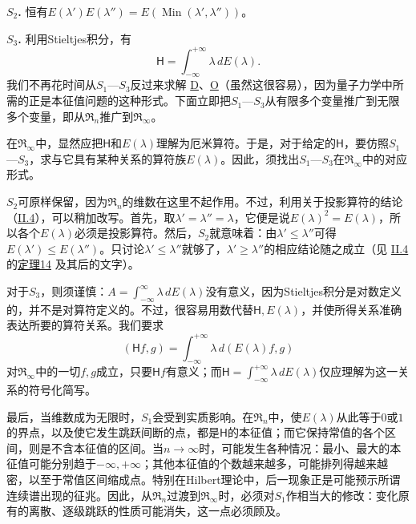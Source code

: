 \documentclass[fontsize=13pt,twoside,openany,headings=normal,parskip=false,bookmarkpackage=false,DIV=calc]{scrbook}
\begin{document}
\leavevmode{}\textbf{$S_2$.}\label{cond:II.S2} 恒有$E(\lambda')E(\lambda'')=E(\operatorname{Min}(\lambda',\allowbreak \lambda''))$。

\leavevmode{}\textbf{$S_3$.}\label{cond:II.S3} 利用Stieltjes积分，有
\[
\mathsf H=\int_{-\infty}^{+\infty}\lambda\,dE(\lambda).
\]
我们不再花时间从$\hyperref[cond:II.S1]{S_1}$—$\hyperref[cond:II.S3]{S_3}$反过来求解 \hyperref[eq:II.7.D]{D}、\hyperref[eq:II.7.O]{O}（虽然这很容易），因为量子力学中所需的正是本征值问题的这种形式。下面立即把$\hyperref[cond:II.S1]{S_1}$—$\hyperref[cond:II.S3]{S_3}$从有限多个变量推广到无限多个变量，即从$\mathfrak{R}_n$推广到$\mathfrak{R}_\infty$。

在$\mathfrak{R}_\infty$中，显然应把$\mathsf H$和$E(\lambda)$理解为厄米算符。于是，对于给定的$\mathsf H$，要仿照$\hyperref[cond:II.S1]{S_1}$—$\hyperref[cond:II.S3]{S_3}$，求与它具有某种关系的算符族$E(\lambda)$。因此，须找出$\hyperref[cond:II.S1]{S_1}$—$\hyperref[cond:II.S3]{S_3}$在$\mathfrak{R}_\infty$中的对应形式。

$\hyperref[cond:II.S2]{S_2}$可原样保留，因为$\mathfrak{R}_n$的维数在这里不起作用。不过，利用关于投影算符的结论（\hyperref[sec:II.4]{II.4}），可以稍加改写。首先，取$\lambda'=\lambda''=\lambda$，它便是说$E(\lambda)^2=E(\lambda)$，所以各个$E(\lambda)$必须是投影算符。然后，$\hyperref[cond:II.S2]{S_2}$就意味着：由$\lambda'\leq\lambda''$可得$E(\lambda')\leq E(\lambda'')$。只讨论$\lambda'\leq\lambda''$就够了，$\lambda'\geq\lambda''$的相应结论随之成立（见 \hyperref[sec:II.4]{II.4} 的\CJKglue \hyperref[thm:II.14]{定理14} 及其后的文字）。

\hypertarget{origpage-60}{}\label{origpage-60}对于$\hyperref[cond:II.S3]{S_3}$，则须谨慎：$A=\int_{-\infty}^{\infty}\lambda\,dE(\lambda)$没有意义，因为Stieltjes积分是对数定义的，并不是对算符定义的。不过，很容易用数代替$\mathsf H,\allowbreak E(\lambda)$，并使所得关系准确表达所要的算符关系。我们要求
\[
(\mathsf Hf,g)=\int_{-\infty}^{+\infty}\lambda\,d(E(\lambda)f,g)
\]
对$\mathfrak{R}_\infty$中的一切$f,\allowbreak g$成立，只要$\mathsf Hf$有意义；而$\mathsf H=\int_{-\infty}^{+\infty}\lambda\,dE(\lambda)$仅应理解为这一关系的符号化简写。

最后，当维数成为无限时，$\hyperref[cond:II.S1]{S_1}$会受到实质影响。在$\mathfrak{R}_n$中，使$E(\lambda)$从此等于$0$或$1$的界点，以及使它发生跳跃间断的点，都是$\mathsf H$的本征值；而它保持常值的各个区间，则是不含本征值的区间。当$n\to\infty$时，可能发生各种情况：最小、最大的本征值可能分别趋于$-\infty,\allowbreak +\infty$；其他本征值的个数越来越多，可能排列得越来越密，以至于常值区间缩成点。特别在Hilbert理论中，后一现象正是可能预示所谓连续谱出现的征兆。因此，从$\mathfrak{R}_n$过渡到$\mathfrak{R}_\infty$时，必须对$\hyperref[cond:II.S1]{S_1}$作相当大的修改：变化原有的离散、逐级跳跃的性质可能消失，这一点必须顾及。
\end{document}
